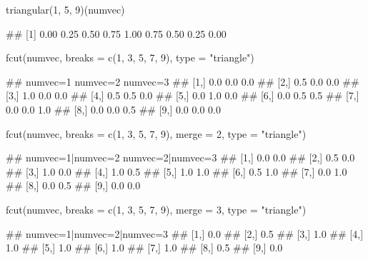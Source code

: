 \documentclass{article}\usepackage[]{graphicx}\usepackage[]{color}
\begin{document}
\begin{Schunk}
% --begin: "fcut.triangular"
\begin{Sinput}
triangular(1, 5, 9)(numvec)
\end{Sinput}
\begin{Soutput}
## [1] 0.00 0.25 0.50 0.75 1.00 0.75 0.50 0.25 0.00
\end{Soutput}
%
% --end: "fcut.triangular"
\end{Schunk}

\begin{Schunk}
% --begin: "fcut.numeric2"
\begin{Sinput}
fcut(numvec, breaks = c(1, 3, 5, 7, 9), type = "triangle")
\end{Sinput}
\begin{Soutput}
##       numvec=1 numvec=2 numvec=3
##  [1,]      0.0      0.0      0.0
##  [2,]      0.5      0.0      0.0
##  [3,]      1.0      0.0      0.0
##  [4,]      0.5      0.5      0.0
##  [5,]      0.0      1.0      0.0
##  [6,]      0.0      0.5      0.5
##  [7,]      0.0      0.0      1.0
##  [8,]      0.0      0.0      0.5
##  [9,]      0.0      0.0      0.0
\end{Soutput}
%
% --end: "fcut.numeric2"
\end{Schunk}

\begin{Schunk}
% --begin: "fcut.merge"
\begin{Sinput}
fcut(numvec, breaks = c(1, 3, 5, 7, 9), merge = 2, type = "triangle")
\end{Sinput}
\begin{Soutput}
##       numvec=1|numvec=2 numvec=2|numvec=3
##  [1,]               0.0               0.0
##  [2,]               0.5               0.0
##  [3,]               1.0               0.0
##  [4,]               1.0               0.5
##  [5,]               1.0               1.0
##  [6,]               0.5               1.0
##  [7,]               0.0               1.0
##  [8,]               0.0               0.5
##  [9,]               0.0               0.0
\end{Soutput}
\begin{Sinput}
fcut(numvec, breaks = c(1, 3, 5, 7, 9), merge = 3, type = "triangle")
\end{Sinput}
\begin{Soutput}
##       numvec=1|numvec=2|numvec=3
##  [1,]                        0.0
##  [2,]                        0.5
##  [3,]                        1.0
##  [4,]                        1.0
##  [5,]                        1.0
##  [6,]                        1.0
##  [7,]                        1.0
##  [8,]                        0.5
##  [9,]                        0.0
\end{Soutput}
%
% --end: "fcut.merge"
\end{Schunk}
\end{document}

